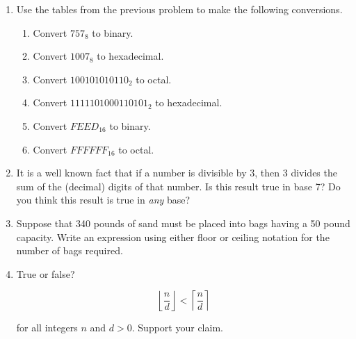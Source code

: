 \begin{enumerate}
{\vfill

}

\hintspagebreak
\workbookpagebreak
\textbookpagebreak

\item Use the tables from the previous problem to make the following conversions.

\begin{enumerate}
\item Convert $757_8$ to binary.
\item Convert $1007_8$ to hexadecimal.
\item Convert $100101010110_2$ to octal.
\item Convert $1111101000110101_2$ to hexadecimal.
\item Convert $FEED_{16}$ to binary.
\item Convert $FFFFFF_{16}$ to octal.
\end{enumerate}


\item It is a well known fact that if a number is divisible by 3, then 3
  divides the sum of the (decimal) digits of that number.  Is this
  result true in base 7?  Do you think this result is true in {\em
  any} base? 
 
 \wbvfill
 

\item Suppose that 340 pounds of sand must be placed into bags having
  a 50 pound capacity.  Write an expression using either floor or
  ceiling notation for the number of bags required.

\wbvfill


\item True or false? 

\[ \left\lfloor \frac{n}{d}\right\rfloor < \left\lceil \frac{n}{d}\right\rceil \]
 
\noindent for all integers $n$ and $d>0$. Support your claim.

\wbvfill



\end{enumerate}
